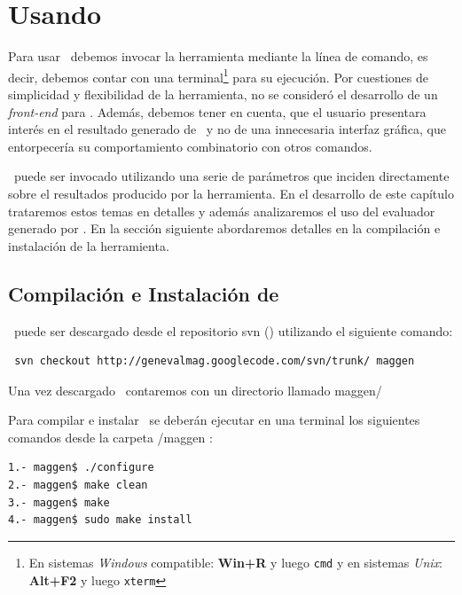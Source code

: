 \chapter{Usando \maggen}
\label{chap:usos}
\minitoc

Para usar \maggen\ debemos invocar la herramienta mediante la línea de comando, es decir, debemos contar con una terminal\footnote{En sistemas \textit{Windows} compatible: \textbf{Win+R} y luego \texttt{cmd} y en sistemas \textit{Unix}: \textbf{Alt+F2} y luego \texttt{xterm}} para su ejecución. Por cuestiones de simplicidad y flexibilidad de la herramienta, no se consideró el desarrollo de un \textit{front-end} para \maggen. Además, debemos tener en cuenta, que el usuario presentara interés en el resultado generado de \maggen\ y no de una innecesaria interfaz gráfica, que entorpecería su comportamiento combinatorio con otros comandos.
  
\maggen\ puede ser invocado utilizando una serie de parámetros que inciden directamente sobre el resultados producido por la herramienta. En el desarrollo de este capítulo trataremos estos temas en detalles y además analizaremos el uso del evaluador generado por \maggen. En la sección siguiente abordaremos detalles en la compilación e instalación de la herramienta.

\section{Compilación e Instalación de \maggen}
\maggen\ puede ser descargado desde el repositorio svn (\cite{svn-book}) utilizando el siguiente comando:
\begin{verbatim}
 svn checkout http://genevalmag.googlecode.com/svn/trunk/ maggen
\end{verbatim}

Una vez descargado \maggen\ contaremos con un directorio llamado {\sf maggen/}

Para compilar e instalar \maggen\ se deberán ejecutar en una terminal los siguientes comandos desde la carpeta {\sf /maggen} :
\begin{verbatim}
1.- maggen$ ./configure
2.- maggen$ make clean
3.- maggen$ make
4.- maggen$ sudo make install
\end{verbatim}

